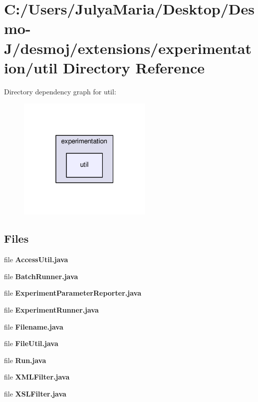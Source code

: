 \section{C\-:/\-Users/\-Julya\-Maria/\-Desktop/\-Desmo-\/\-J/desmoj/extensions/experimentation/util Directory Reference}
\label{dir_e04e7494156216a70f50cc35b0c23c6b}
Directory dependency graph for util\-:
\nopagebreak
\begin{figure}[H]
\begin{center}
\leavevmode
\includegraphics[width=182pt]{dir_e04e7494156216a70f50cc35b0c23c6b_dep}
\end{center}
\end{figure}
\subsection*{Files}
\begin{DoxyCompactItemize}
\item 
file {\bfseries Access\-Util.\-java}
\item 
file {\bfseries Batch\-Runner.\-java}
\item 
file {\bfseries Experiment\-Parameter\-Reporter.\-java}
\item 
file {\bfseries Experiment\-Runner.\-java}
\item 
file {\bfseries Filename.\-java}
\item 
file {\bfseries File\-Util.\-java}
\item 
file {\bfseries Run.\-java}
\item 
file {\bfseries X\-M\-L\-Filter.\-java}
\item 
file {\bfseries X\-S\-L\-Filter.\-java}
\end{DoxyCompactItemize}
